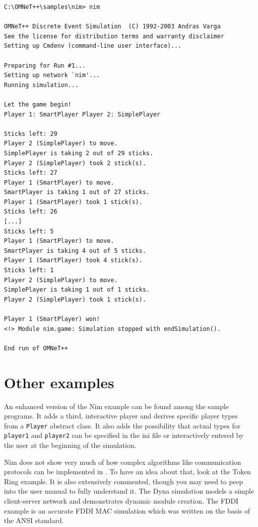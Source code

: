 \begin{verbatim}
C:\OMNeT++\samples\nim> nim

OMNeT++ Discrete Event Simulation  (C) 1992-2003 Andras Varga
See the license for distribution terms and warranty disclaimer
Setting up Cmdenv (command-line user interface)...

Preparing for Run #1...
Setting up network `nim'...
Running simulation...

Let the game begin!
Player 1: SmartPlayer Player 2: SimplePlayer

Sticks left: 29
Player 2 (SimplePlayer) to move.
SimplePlayer is taking 2 out of 29 sticks.
Player 2 (SimplePlayer) took 2 stick(s).
Sticks left: 27
Player 1 (SmartPlayer) to move.
SmartPlayer is taking 1 out of 27 sticks.
Player 1 (SmartPlayer) took 1 stick(s).
Sticks left: 26
[...]
Sticks left: 5
Player 1 (SmartPlayer) to move.
SmartPlayer is taking 4 out of 5 sticks.
Player 1 (SmartPlayer) took 4 stick(s).
Sticks left: 1
Player 2 (SimplePlayer) to move.
SimplePlayer is taking 1 out of 1 sticks.
Player 2 (SimplePlayer) took 1 stick(s).

Player 1 (SmartPlayer) won!
<!> Module nim.game: Simulation stopped with endSimulation().

End run of OMNeT++
\end{verbatim}



\section{Other examples}

An enhanced version of the Nim example can be found among the sample
programs. It adds a third, interactive player and derives specific
player types from a \texttt{Player} abstract class. It also adds the
possibility that actual types for \texttt{player1} and
\texttt{player2} can be specified in the ini file or interactively
entered by the user at the beginning of the simulation.

Nim does not show very much of how complex algorithms like communication
protocols can be implemented in {\opp}. To have an idea about
that, look at the Token Ring example. It is also extensively
commented, though you may need to peep into the user manual to
fully understand it. The Dyna simulation models a simple
client-server network and demonstrates dynamic module creation.
The FDDI example is an accurate FDDI MAC simulation
which was written on the basis of the ANSI standard.


